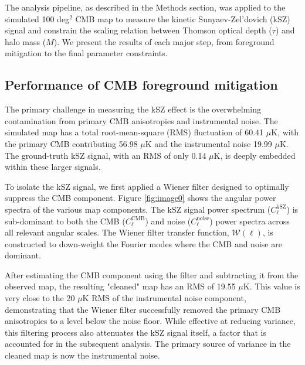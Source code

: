 \documentclass[]{article}
\begin{document}
The analysis pipeline, as described in the Methods section, was applied to the simulated 100 deg$^2$ CMB map to measure the kinetic Sunyaev-Zel'dovich (kSZ) signal and constrain the scaling relation between Thomson optical depth ($\tau$) and halo mass ($M$). We present the results of each major step, from foreground mitigation to the final parameter constraints.

\subsection{Performance of CMB foreground mitigation}

The primary challenge in measuring the kSZ effect is the overwhelming contamination from primary CMB anisotropies and instrumental noise. The simulated map has a total root-mean-square (RMS) fluctuation of 60.41 $\mu$K, with the primary CMB contributing 56.98 $\mu$K and the instrumental noise 19.99 $\mu$K. The ground-truth kSZ signal, with an RMS of only 0.14 $\mu$K, is deeply embedded within these larger signals.

To isolate the kSZ signal, we first applied a Wiener filter designed to optimally suppress the CMB component. Figure \ref{fig:image0} shows the angular power spectra of the various map components. The kSZ signal power spectrum ($C_\ell^{\text{kSZ}}$) is sub-dominant to both the CMB ($C_\ell^{\text{CMB}}$) and noise ($C_\ell^{\text{noise}}$) power spectra across all relevant angular scales. The Wiener filter transfer function, $\mathcal{W}(\ell)$, is constructed to down-weight the Fourier modes where the CMB and noise are dominant.

After estimating the CMB component using the filter and subtracting it from the observed map, the resulting "cleaned" map has an RMS of 19.55 $\mu$K. This value is very close to the 20 $\mu$K RMS of the instrumental noise component, demonstrating that the Wiener filter successfully removed the primary CMB anisotropies to a level below the noise floor. While effective at reducing variance, this filtering process also attenuates the kSZ signal itself, a factor that is accounted for in the subsequent analysis. The primary source of variance in the cleaned map is now the instrumental noise.
\end{document}
